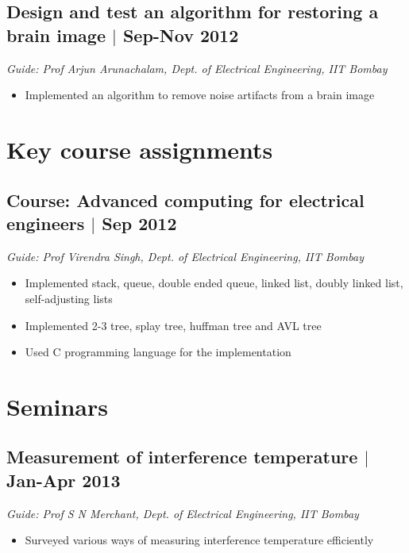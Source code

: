 \documentclass[11pt]{article}
\begin{document}
\subsection*{Design and test an algorithm for restoring a brain image $\vert$  Sep-Nov 2012}
\emph{Guide: Prof Arjun Arunachalam, Dept. of Electrical Engineering, IIT Bombay}  
\begin{itemize}
\item Implemented an algorithm to remove noise artifacts from a brain image  
\end{itemize}


\section*{Key course assignments}
\subsection*{Course: Advanced computing for electrical engineers $\vert$ Sep 2012}
\emph{Guide: Prof Virendra Singh, Dept. of Electrical Engineering, IIT Bombay}
\begin{itemize}
\item Implemented stack, queue, double ended queue, linked list, doubly linked list, self-adjusting lists
\item Implemented 2-3 tree, splay tree,  huffman tree and AVL tree
\item Used C programming language for the implementation
\end{itemize}

\section*{Seminars}
\subsection*{Measurement of interference temperature $\vert$  Jan-Apr 2013} 
\emph{Guide: Prof S N Merchant, Dept. of Electrical Engineering, IIT Bombay}
\begin{itemize}  
\item Surveyed various ways of measuring interference temperature efficiently 
\end{itemize}
  
\end{document}
